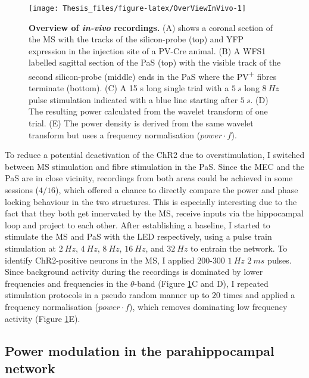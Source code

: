 \documentclass[
  12pt,
  a4paper,
  openany]{book}
\begin{document}
\begin{figure}[H]
\texttt{[image: Thesis\_files/figure-latex/OverViewInVivo-1]} \caption[Overview of \emph{in-vivo} recordings]{\textbf{Overview of \emph{in-vivo} recordings.} (A) shows a coronal section of the MS with the tracks of the silicon-probe (top) and YFP expression in the injection site of a PV-Cre animal. (B) A WFS1 labelled sagittal section of the PaS (top) with the visible track of the second silicon-probe (middle) ends in the PaS where the PV\textsuperscript{+} fibres terminate (bottom). (C) A 15 s long single trial with a \(5\ s\) long \(8\ Hz\) pulse stimulation indicated with a blue line starting after \(5\ s\). (D) The resulting power calculated from the wavelet transform of one trial. (E) The power density is derived from the same wavelet transform but uses a frequency normalisation (\(power\cdot f\)).}\label{fig:OverViewInVivo}
\end{figure}

\noindent To reduce a potential deactivation of the ChR2 due to overstimulation, I switched between MS stimulation and fibre stimulation in the PaS. Since the MEC and the PaS are in close vicinity, recordings from both areas could be achieved in some sessions (\(4/16\)), which offered a chance to directly compare the power and phase locking behaviour in the two structures. This is especially interesting due to the fact that they both get innervated by the MS, receive inputs via the hippocampal loop and project to each other. After establishing a baseline, I started to stimulate the MS and PaS with the LED respectively, using a pulse train stimulation at \(2\ Hz\), \(4\ Hz\), \(8\ Hz\), \(16\ Hz\), and \(32\ Hz\) to entrain the network. To identify ChR2-positive neurons in the MS, I applied \(200\)-\(300\) \(1\ Hz\) \(2\ ms\) pulses. Since background activity during the recordings is dominated by lower frequencies and frequencies in the \(\theta\)-band (Figure \ref{fig:OverViewInVivo}C and D), I repeated stimulation protocols in a pseudo random manner up to \(20\) times and applied a frequency normalisation (\(power\cdot f\)), which removes dominating low frequency activity (Figure \ref{fig:OverViewInVivo}E).

\FloatBarrier

\hypertarget{power-modulation-in-the-parahippocampal-network}{%
\subsection{Power modulation in the parahippocampal network}\label{power-modulation-in-the-parahippocampal-network}}
\end{document}
